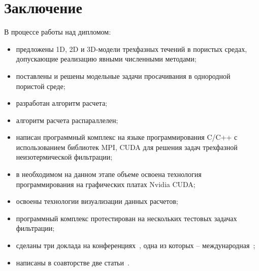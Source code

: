 \section{Заключение}

В процессе работы над дипломом:

\begin{itemize}
	\item 	предложены 1D, 2D и 3D-модели трехфазных течений в пористых средах,
	допускающие реализацию явными численными методами;

	\item поставлены и решены модельные задачи просачивания в однородной 
	пористой среде;

	\item разработан алгоритм расчета;
	
	\item алгоритм расчета распараллелен;
	
	\item написан программный комплекс на языке программирования C/C++ с использованием 
	библиотек MPI, CUDA для решения задач трехфазной неизотермической фильтрации;
	
	\item в необходимом на данном этапе объеме освоена технология 
	программирования на графических платах Nvidia CUDA;

	\item освоены технологии визуализации данных расчетов;

	\item программный комплекс протестирован на нескольких тестовых задачах 
	фильтрации;
	
	\item сделаны три доклада на конференциях~, одна из которых -- международная~;

	\item написаны в соавторстве две статьи~.
\end{itemize}
